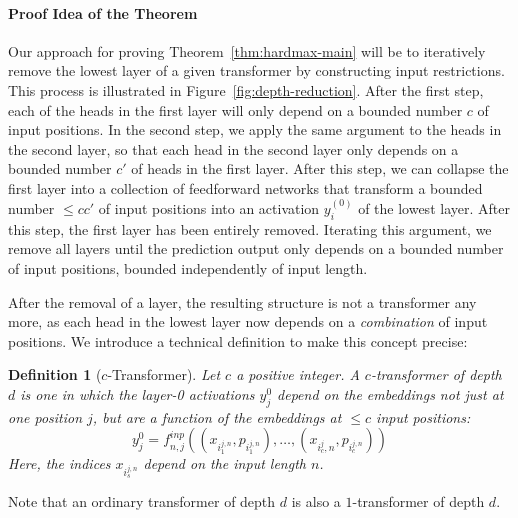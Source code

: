 \documentclass[11pt,a4paper]{article}
\newcounter{theorem}
\newtheorem{defin}[theorem]{Definition}
\begin{document}
\paragraph{Proof Idea of the Theorem}
Our approach for proving Theorem~\ref{thm:hardmax-main} will be to iteratively remove the lowest layer of a given transformer by constructing input restrictions.
This process is illustrated in Figure~\ref{fig:depth-reduction}.
After the first step, each of the heads in the first layer will only depend on a bounded number $c$ of input positions.
In the second step, we apply the same argument to the heads in the second layer, so that each head in the second layer only depends on a bounded number $c'$ of heads in the first layer.
After this step, we can collapse the first layer into a collection of feedforward networks that transform a bounded number $\leq cc'$ of input positions into an activation $y_i^{(0)}$ of the lowest layer.
After this step, the first layer has been entirely removed.
Iterating this argument, we remove all layers until the prediction output only depends on a bounded number of input positions, bounded independently of input length.

After the removal of a layer, the resulting structure is not a transformer any more, as each head in the lowest layer now depends on a \emph{combination} of input positions.
We introduce a technical definition to make this concept precise:

\begin{defin}[$c$-Transformer]
Let $c$ a positive integer. A $c$-transformer of depth $d$ is one in which the layer-0 activations $y_j^0$ depend on the embeddings not just at one position $j$, but are a function of the embeddings at $\leq c$ input positions:
\begin{equation}
    y_j^0 = f^{inp}_{n,j}((x_{i_1^{j,n}}, p_{i_1^{j,n}}), \dots, (x_{i_c^{j},n}, p_{i_c^{j,n}} ))
\end{equation}
Here, the indices $x_{i_s^{j,n}}$ depend on the input length $n$.
\end{defin}

Note that an ordinary transformer  of depth $d$ is also a $1$-transformer of depth $d$.
\end{document}
